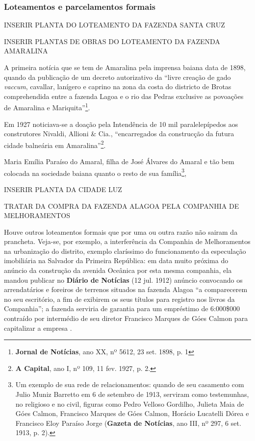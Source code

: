 \subsubsection{Loteamentos e parcelamentos formais}

INSERIR PLANTA DO LOTEAMENTO DA FAZENDA SANTA CRUZ

INSERIR PLANTAS DE OBRAS DO LOTEAMENTO DA FAZENDA AMARALINA

A primeira notícia que se tem de Amaralina pela imprensa baiana data de 1898, quando da publicação de um decreto autorizativo da ``livre creação de gado \textit{vaccum}, cavallar,  lanígero e caprino na zona da costa do districto de Brotas comprehendida entre a fazenda Lagoa e o rio das Pedras exclusive as povoações de Amaralina e Mariquita''\footnote{\textbf{Jornal de Notícias}, ano XX, nº 5612, 23 set. 1898, p. 1}.

Em 1927 noticiava-se a doação pela Intendência de 10 mil paralelepípedos aos construtores Nivaldi, Allioni \& Cia., ``encarregados da construcção da futura cidade balneária em Amaralina''\footnote{\textbf{A Capital}, ano I, nº 109, 11 fev. 1927, p. 2.}.

Maria Emília Paraíso do Amaral, filha de José Álvares do Amaral e tão bem colocada na sociedade baiana quanto o resto de sua família\footnote{Um exemplo de sua rede de relacionamentos: quando de seu casamento com Julio Muniz Barretto em 6 de setembro de 1913, serviram como testemunhas, no religioso e no civil, figuras como Pedro Velloso Gordilho, Julieta Maia de Góes Calmon, Francisco Marques de Góes Calmon, Horácio Lucatelli Dórea e Francisco Eloy Paraíso Jorge (\textbf{Gazeta de Notícias}, ano III, nº 297, 6 set. 1913, p. 2).}, 

INSERIR PLANTA DA CIDADE LUZ

TRATAR DA COMPRA DA FAZENDA ALAGOA PELA COMPANHIA DE MELHORAMENTOS

Houve outros loteamentos formais que por uma ou outra razão não sairam da prancheta. Veja-se, por exemplo, a interferência da Companhia de Melhoramentos na urbanização do distrito, exemplo claríssimo do funcionamento da especulação imobiliária na Salvador da Primeira República: em data muito próxima do anúncio da construção da avenida Oceânica por esta mesma companhia, ela mandou publicar no \textbf{Diário de Notícias} (12 jul. 1912) anúncio convocando os arrendatários e foreiros de terrenos situados na fazenda Alagoa ``a comparecerem no seu escritório, a fim de exibirem os seus títulos para registro nos livros da Companhia''; a fazenda serviria de garantia para um empréstimo de 6:000\$000 contraído por intermédio de seu diretor Francisco Marques de Góes Calmon para capitalizar a empresa \cite[p.~123]{CUNHA2011}.

